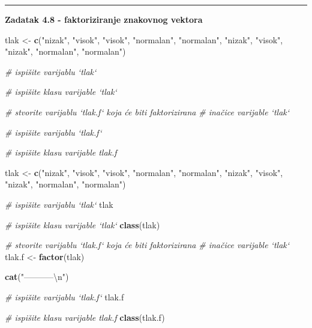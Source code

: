 \documentclass[]{book}
\newenvironment{Shaded}{\begin{snugshade}}{\end{snugshade}}
\newcommand{\KeywordTok}[1]{\textcolor[rgb]{0.13,0.29,0.53}{\textbf{#1}}}
\newcommand{\CharTok}[1]{\textcolor[rgb]{0.31,0.60,0.02}{#1}}
\newcommand{\StringTok}[1]{\textcolor[rgb]{0.31,0.60,0.02}{#1}}
\newcommand{\CommentTok}[1]{\textcolor[rgb]{0.56,0.35,0.01}{\textit{#1}}}
\newcommand{\NormalTok}[1]{#1}
\theoremstyle{definition}
\theoremstyle{definition}
\theoremstyle{definition}
\theoremstyle{remark}
\begin{document}
\begin{center}\rule{0.5\linewidth}{\linethickness}\end{center}

\textbf{Zadatak 4.8 - faktoriziranje znakovnog vektora}

\begin{Shaded}
\begin{Highlighting}[]
\NormalTok{tlak <-}\StringTok{ }\KeywordTok{c}\NormalTok{(}\StringTok{"nizak"}\NormalTok{, }\StringTok{"visok"}\NormalTok{, }\StringTok{"visok"}\NormalTok{, }\StringTok{"normalan"}\NormalTok{, }\StringTok{"normalan"}\NormalTok{, }
          \StringTok{"nizak"}\NormalTok{, }\StringTok{"visok"}\NormalTok{, }\StringTok{"nizak"}\NormalTok{, }\StringTok{"normalan"}\NormalTok{, }\StringTok{"normalan"}\NormalTok{)}

\CommentTok{# ispišite varijablu `tlak`}

\CommentTok{# ispišite klasu varijable `tlak`}

\CommentTok{# stvorite varijablu `tlak.f` koja će biti faktorizirana}
\CommentTok{# inačice varijable `tlak`}

\CommentTok{# ispišite varijablu `tlak.f`}

\CommentTok{# ispišite klasu varijable tlak.f}
\end{Highlighting}
\end{Shaded}

\begin{Shaded}
\begin{Highlighting}[]
\NormalTok{tlak <-}\StringTok{ }\KeywordTok{c}\NormalTok{(}\StringTok{"nizak"}\NormalTok{, }\StringTok{"visok"}\NormalTok{, }\StringTok{"visok"}\NormalTok{, }\StringTok{"normalan"}\NormalTok{, }\StringTok{"normalan"}\NormalTok{, }
          \StringTok{"nizak"}\NormalTok{, }\StringTok{"visok"}\NormalTok{, }\StringTok{"nizak"}\NormalTok{, }\StringTok{"normalan"}\NormalTok{, }\StringTok{"normalan"}\NormalTok{)}

\CommentTok{# ispišite varijablu `tlak`}
\NormalTok{tlak}

\CommentTok{# ispišite klasu varijable `tlak`}
\KeywordTok{class}\NormalTok{(tlak)}

\CommentTok{# stvorite varijablu `tlak.f` koja će biti faktorizirana}
\CommentTok{# inačice varijable `tlak`}
\NormalTok{tlak.f <-}\StringTok{ }\KeywordTok{factor}\NormalTok{(tlak)}

\KeywordTok{cat}\NormalTok{(}\StringTok{"-----------}\CharTok{\textbackslash{}n}\StringTok{"}\NormalTok{)}

\CommentTok{# ispišite varijablu `tlak.f`}
\NormalTok{tlak.f}

\CommentTok{# ispišite klasu varijable tlak.f}
\KeywordTok{class}\NormalTok{(tlak.f)}
\end{Highlighting}
\end{Shaded}
\end{document}
